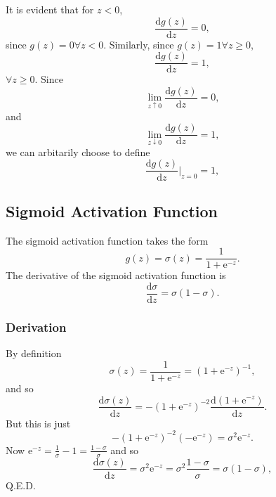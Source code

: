 \documentclass[modern]{aastex61}
\newcommand{\ue}{\mathrm{e}}
\newcommand{\uderivative}{\mathrm{d}}
\begin{document}
It is evident that for $z < 0$,
\begin{equation*}
  \frac{\uderivative g(z)}{\uderivative z} = 0,
\end{equation*}
since $g(z) = 0 \forall z < 0$. Similarly, since $g(z) = 1 \forall z \geq 0$,
\begin{equation*}
  \frac{\uderivative g(z)}{\uderivative z} = 1,
\end{equation*}
$\forall z \geq 0$. Since
\begin{equation*}
  \underset{z \uparrow 0}{\lim}\frac{\uderivative g(z)}{\uderivative z} = 0,
\end{equation*}
and
\begin{equation*}
  \underset{z \downarrow 0}{\lim}\frac{\uderivative g(z)}{\uderivative z} = 1,
\end{equation*}
we can arbitarily choose to define
\begin{equation*}
  \frac{\uderivative g(z)}{\uderivative z}\Bigr|_{z = 0} = 1,
\end{equation*}

\subsection{Sigmoid Activation Function} \label{sec:sigmoid}

The sigmoid activation function takes the form
\begin{equation} \label{eq:sigmoid}
  g(z) = \sigma(z) = \frac{1}{1 + \ue^{-z}}.
\end{equation}
The derivative of the sigmoid activation function is
\begin{equation} \label{eq:sigmoidderivative}
  \frac{\uderivative \sigma}{\uderivative z} = \sigma(1 - \sigma).
\end{equation}

\subsubsection{Derivation}

By definition
\begin{equation*}
  \sigma(z) = \frac{1}{1 + \ue^{-z}} = (1 + \ue^{-z})^{-1},
\end{equation*}
and so
\begin{equation*}
  \frac{\uderivative \sigma(z)}{\uderivative z} = -(1 + \ue^{-z})^{-2} \frac{\uderivative (1 + \ue^{-z}) }{\uderivative z}.
\end{equation*}
But this is just
\begin{equation*}
  -(1 + \ue^{-z})^{-2} (-\ue^{-z}) = \sigma^{2} \ue^{-z}.
\end{equation*}
Now $\ue^{-z} = \frac{1}{\sigma} - 1 = \frac{1 - \sigma}{\sigma}$ and so
\begin{equation*}
  \frac{\uderivative \sigma(z)}{\uderivative z} = \sigma^{2} \ue^{-z} = \sigma^{2} \frac{1 - \sigma}{\sigma} = \sigma (1 - \sigma),
\end{equation*}
Q.E.D.
\end{document}
